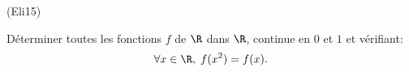 \begin{tiny}(Eli15)\end{tiny} Déterminer toutes les fonctions $f$ de $\R$ dans $\R$, continue en $0$ et $1$ et vérifiant:
\[
  \forall x\in \R,\; f(x^2) = f(x).
\]
